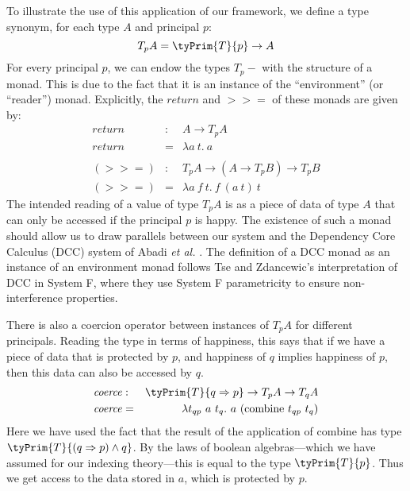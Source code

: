 To illustrate the use of this application of our framework, we define
a type synonym, for each type $A$ and principal $p$:
\begin{displaymath}
  T_pA = \tyPrim{T}{p} \to A
\end{displaymath}
For every principal $p$, we can endow the types $T_p-$ with the
structure of a monad. This is due to the fact that it is an instance
of the ``environment'' (or ``reader'') monad. Explicitly, the
$\mathit{return}$ and $>>=$ of these monads are given by:
\begin{eqnarray*}
  \mathit{return} & : & A \to T_pA \\
  \mathit{return} & = & \lambda a\ t.\ a \\
  \\
  (>>=) & : & T_pA \to (A \to T_pB) \to T_pB \\
  (>>=) & = & \lambda a\ f\ t.\ f\ (a\ t)\ t
\end{eqnarray*}
The intended reading of a value of type $T_pA$ is as a piece of data
of type $A$ that can only be accessed if the principal $p$ is
happy. The existence of such a monad should allow us to draw parallels
between our system and the Dependency Core Calculus (DCC) system of
Abadi \emph{et al.} \cite{abadi99core}. The definition of a DCC monad
as an instance of an environment monad follows Tse and Zdancewic's
interpretation of DCC in System F, where they use System F
parametricity to ensure non-interference properties.

There is also a coercion operator between instances of $T_pA$ for
different principals. Reading the type in terms of happiness, this
says that if we have a piece of data that is protected by $p$, and
happiness of $q$ implies happiness of $p$, then this data can also be
accessed by $q$.
\begin{eqnarray*}
  \mathit{coerce} & : & \tyPrim{T}{q \Rightarrow p} \to T_pA \to T_qA \\
  \mathit{coerce} & = & \lambda t_{qp}\ a\ t_q.\ a\ (\mathrm{combine}\ t_{qp}\ t_q)
\end{eqnarray*}
Here we have used the fact that the result of the application of
$\mathrm{combine}$ has type $\tyPrim{T}{(q \Rightarrow p) \land
  q}$. By the laws of boolean algebras---which we have assumed for our
indexing theory---this is equal to the type $\tyPrim{T}{p}$. Thus we
get access to the data stored in $a$, which is protected by $p$.

